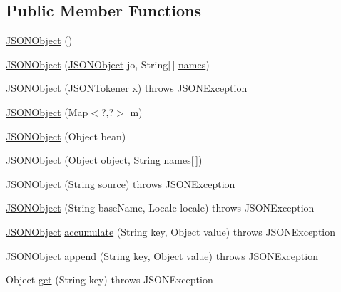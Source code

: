 \subsection*{Public Member Functions}
\begin{DoxyCompactItemize}
\item 
\hyperlink{classorg_1_1json_1_1JSONObject_a7c17e59daff74ce50c6677c6f5da233d}{J\-S\-O\-N\-Object} ()
\item 
\hyperlink{classorg_1_1json_1_1JSONObject_a0e61a2a56e4a34ac5c8730497c320fe9}{J\-S\-O\-N\-Object} (\hyperlink{classorg_1_1json_1_1JSONObject}{J\-S\-O\-N\-Object} jo, String\mbox{[}$\,$\mbox{]} \hyperlink{classorg_1_1json_1_1JSONObject_a02e83de70e290231527d1760c4dd30fc}{names})
\item 
\hyperlink{classorg_1_1json_1_1JSONObject_a30954f996711f48cb2dc9b456824e02e}{J\-S\-O\-N\-Object} (\hyperlink{classorg_1_1json_1_1JSONTokener}{J\-S\-O\-N\-Tokener} x)  throws J\-S\-O\-N\-Exception 
\item 
\hyperlink{classorg_1_1json_1_1JSONObject_a424ab17cdb94e2a79165bf852bee570c}{J\-S\-O\-N\-Object} (Map$<$?,?$>$ m)
\item 
\hyperlink{classorg_1_1json_1_1JSONObject_adf96cd2952efa10c86156b9c8f4fe9b1}{J\-S\-O\-N\-Object} (Object bean)
\item 
\hyperlink{classorg_1_1json_1_1JSONObject_af3f343eaf2cca8718a55d0f105807f9b}{J\-S\-O\-N\-Object} (Object object, String \hyperlink{classorg_1_1json_1_1JSONObject_a02e83de70e290231527d1760c4dd30fc}{names}\mbox{[}$\,$\mbox{]})
\item 
\hyperlink{classorg_1_1json_1_1JSONObject_a015b17aea42a3c1762b66cd1c0803d04}{J\-S\-O\-N\-Object} (String source)  throws J\-S\-O\-N\-Exception 
\item 
\hyperlink{classorg_1_1json_1_1JSONObject_a8c9f78e54c6e38ecb786fee7163e26fa}{J\-S\-O\-N\-Object} (String base\-Name, Locale locale)  throws J\-S\-O\-N\-Exception 
\item 
\hyperlink{classorg_1_1json_1_1JSONObject}{J\-S\-O\-N\-Object} \hyperlink{classorg_1_1json_1_1JSONObject_a2c8b90ffd10c970175d63daf3e682634}{accumulate} (String key, Object value)  throws J\-S\-O\-N\-Exception 
\item 
\hyperlink{classorg_1_1json_1_1JSONObject}{J\-S\-O\-N\-Object} \hyperlink{classorg_1_1json_1_1JSONObject_ae6f06b948080a76425a818ebcfb2c001}{append} (String key, Object value)  throws J\-S\-O\-N\-Exception 
\item 
Object \hyperlink{classorg_1_1json_1_1JSONObject_ac98329762a354373a0d3fddc2855dd61}{get} (String key)  throws J\-S\-O\-N\-Exception 

\end{DoxyCompactItemize}
